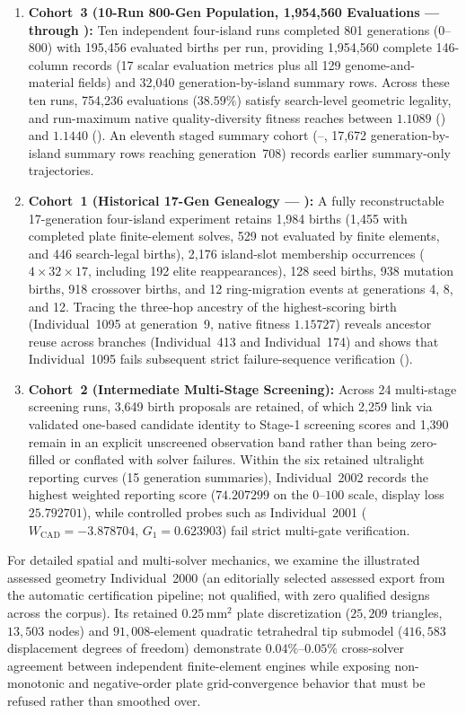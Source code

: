 \begin{enumerate}[leftmargin=*,nosep]
  \item \textbf{Cohort~3 (10-Run 800-Gen Population, 1,954,560 Evaluations ---  through ):} Ten independent four-island runs completed 801 generations ($0$--$800$) with 195,456 evaluated births per run, providing 1,954,560 complete 146-column records (17 scalar evaluation metrics plus all 129 genome-and-material fields) and 32,040 generation-by-island summary rows. Across these ten runs, 754,236 evaluations ($38.59\%$) satisfy search-level geometric legality, and run-maximum native quality-diversity fitness reaches between $1.1089$ () and $1.1440$ (). An eleventh staged summary cohort (--, 17,672 generation-by-island summary rows reaching generation~708) records earlier summary-only trajectories.
  \item \textbf{Cohort~1 (Historical 17-Gen Genealogy --- ):} A fully reconstructable 17-generation four-island experiment retains 1,984 births (1,455 with completed plate finite-element solves, 529 not evaluated by finite elements, and 446 search-legal births), 2,176 island-slot membership occurrences ($4\times 32\times 17$, including 192 elite reappearances), 128 seed births, 938 mutation births, 918 crossover births, and 12 ring-migration events at generations 4, 8, and 12. Tracing the three-hop ancestry of the highest-scoring birth (Individual~1095 at generation~9, native fitness $1.15727$) reveals ancestor reuse across branches (Individual~413 and Individual~174) and shows that Individual~1095 fails subsequent strict failure-sequence verification ().
  \item \textbf{Cohort~2 (Intermediate Multi-Stage Screening):} Across 24 multi-stage screening runs, 3,649 birth proposals are retained, of which 2,259 link via validated one-based candidate identity to Stage-1 screening scores and 1,390 remain in an explicit unscreened observation band rather than being zero-filled or conflated with solver failures. Within the six retained ultralight reporting curves (15 generation summaries), Individual~2002 records the highest weighted reporting score ($74.207299$ on the $0$--$100$ scale, display loss $25.792701$), while controlled probes such as Individual~2001 ($W_{\text{CAD}} = -3.878704$, $G_1 = 0.623903$) fail strict multi-gate verification.
\end{enumerate}

For detailed spatial and multi-solver mechanics, we examine the illustrated assessed geometry Individual~2000 (an editorially selected assessed export from the automatic certification pipeline; not qualified, with zero qualified designs across the corpus). Its retained $0.25\,\mathrm{mm}^2$ plate discretization ($25{,}209$ triangles, $13{,}503$ nodes) and $91{,}008$-element quadratic tetrahedral tip submodel ($416{,}583$ displacement degrees of freedom) demonstrate $0.04\%$--$0.05\%$ cross-solver agreement between independent finite-element engines while exposing non-monotonic and negative-order plate grid-convergence behavior that must be refused rather than smoothed over.

